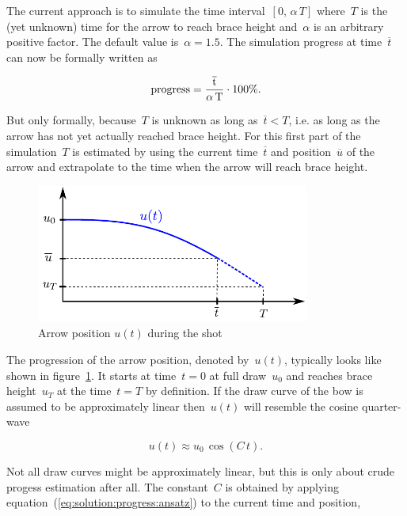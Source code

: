 The current approach is to simulate the time interval~$[0,\,\alpha\,T]$ where~$T$ is the (yet unknown) time for the arrow to reach brace height and~$\alpha$ is an arbitrary positive factor.
The default value is~$\alpha = 1.5$. The simulation progress at time~$\overline{t}$ can now be formally written as

\begin{equation}
\rm{progress} = \frac{\overline{t}}{\alpha\,T}\cdot 100\%.\label{eq:solution:progress}
\end{equation}

But only formally, because~$T$ is unknown as long as~$\overline{t} < T$, i.e. as long as the arrow has not yet actually reached brace height. For this first part of the simulation~$T$ is estimated by using the current time~$\overline{t}$ and position~$\overline{u}$ of the arrow and extrapolate to the time when the arrow will reach brace height.

\begin{figure}[h]
\centering
\includegraphics[width=0.8\textwidth]{figures/solution/dynamic_progress}
\caption{Arrow position $u(t)$ during the shot}
\label{fig:solution:dynamic_progress}
\end{figure}

The progression of the arrow position, denoted by~$u(t)$, typically looks like shown in figure~\ref{fig:solution:dynamic_progress}.
It starts at time~$t = 0$ at full draw~$u_0$ and reaches brace height~$u_T$ at the time~$t = T$ by definition.
If the draw curve of the bow is assumed to be approximately linear then~$u(t)$ will resemble the cosine quarter-wave

\begin{equation}
u(t) \approx u_{0}\,\cos{\left(C\,t\right)}.\label{eq:solution:progress:ansatz}
\end{equation}

Not all draw curves might be approximately linear, but this is only about crude progess estimation after all.
The constant~$C$ is obtained by applying equation~(\ref{eq:solution:progress:ansatz}) to the current time and position,

